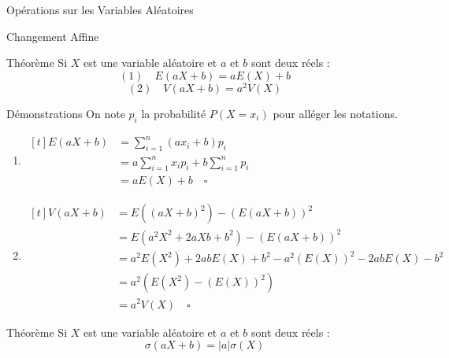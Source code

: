 \documentclass{coursbook}
\begin{document}
    \begin{Gpartie}{Opérations sur les Variables Aléatoires} 
        \begin{Spartie}{Changement Affine} 
            \begin{SSpartie}{Théorème} 
                Si $X$ est une variable aléatoire et $a$ et $b$ sont deux réels : \[(1)\quad E(aX+b)=aE(X)+b\] \[(2)\quad V(aX+b)=a^2V(X)\]
                \begin{SSSpartie}{Démonstrations}
                    On note $p_i$ la probabilité $P(X=x_i)$ pour alléger les notations.
                    \begin{enumerate}[(1),leftmargin=4ex]
                        \item $\begin{aligned}[t]
                            E(aX+b)&=\sum_{i=1}^n\left(a x_i+b\right)p_i \\
                            &=a\sum_{i=1}^n x_i p_i+b\sum_{i=1}^np_i \\
                            &=aE(X)+b\quad\square
                        \end{aligned}$
                        \item $\begin{aligned}[t]
                            V(aX+b)&=E\left((aX+b)^2\right)-\left(E(aX+b)\right)^2 \\
                            &=E\left(a^2X^2+2aXb+b^2\right)-\left(E(aX+b)\right)^2 \\
                            &=a^2E\left(X^2\right)+2abE(X)+b^2-a^2\left(E(X)\right)^2-2abE(X)-b^2 \\
                            &=a^2\left(E\left(X^2\right)-\left(E(X)\right)^2\right) \\
                            &=a^2V(X)\quad\square
                        \end{aligned}$
                    \end{enumerate}
                \end{SSSpartie}
            \end{SSpartie}
            \begin{SSpartie}{Théorème} 
                Si $X$ est une variable aléatoire et $a$ et $b$ sont deux réels : \[\sigma(aX+b)=\lvert a\rvert \sigma(X)\]
\end{SSpartie}
\end{Spartie}
\end{Gpartie}
\end{document}
